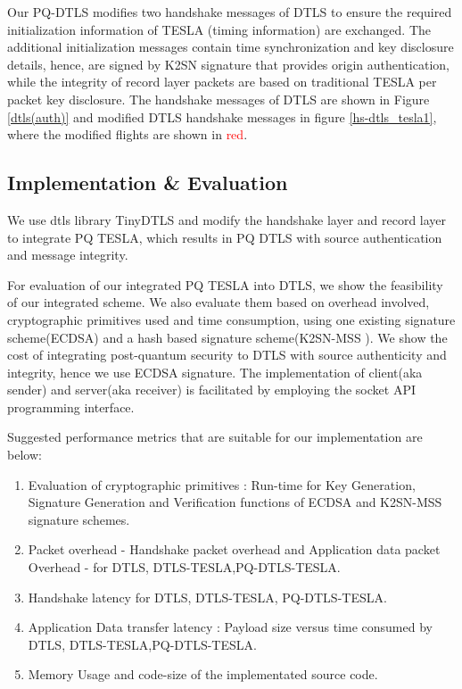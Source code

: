 Our PQ-DTLS modifies two handshake messages of DTLS to ensure the required initialization information of TESLA (timing information) are exchanged. The additional initialization messages contain time synchronization and key disclosure details, hence, are signed by K2SN signature that provides origin authentication, while the integrity of record layer packets are based on traditional TESLA per packet key disclosure. The handshake messages of DTLS are shown in Figure \ref{dtls(auth)} and modified DTLS handshake messages in figure \ref{hs-dtls_tesla1}, where the modified flights are shown in \textcolor{red}{red}.

\subsection{Implementation \& Evaluation} We use dtls library TinyDTLS\cite{} and modify the handshake layer and record layer to integrate PQ TESLA, which results in PQ DTLS with source authentication and message integrity.


For evaluation of our integrated PQ TESLA into DTLS, we show the feasibility of our integrated scheme. We also evaluate them based on overhead involved, cryptographic primitives used and time consumption, using one existing signature scheme(ECDSA) and a hash based signature scheme(K2SN-MSS \cite{karati2019k2sn}). We show the cost of integrating post-quantum security to DTLS with source authenticity and integrity, hence we use ECDSA signature. The implementation of client(aka sender) and server(aka receiver) is facilitated by employing the socket API programming interface.

Suggested performance metrics that are suitable for our implementation are below:
\begin{enumerate}
    \item Evaluation of cryptographic primitives : Run-time for Key Generation, Signature Generation and Verification functions of ECDSA and K2SN-MSS signature schemes.
    \item Packet overhead - Handshake packet overhead and Application data packet Overhead - for DTLS, DTLS-TESLA,PQ-DTLS-TESLA.
    \item Handshake latency for DTLS, DTLS-TESLA, PQ-DTLS-TESLA.
    \item Application Data transfer latency : Payload size versus time consumed by DTLS, DTLS-TESLA,PQ-DTLS-TESLA.
    \item Memory Usage and code-size of the implementated source code.
\end{enumerate}{}


